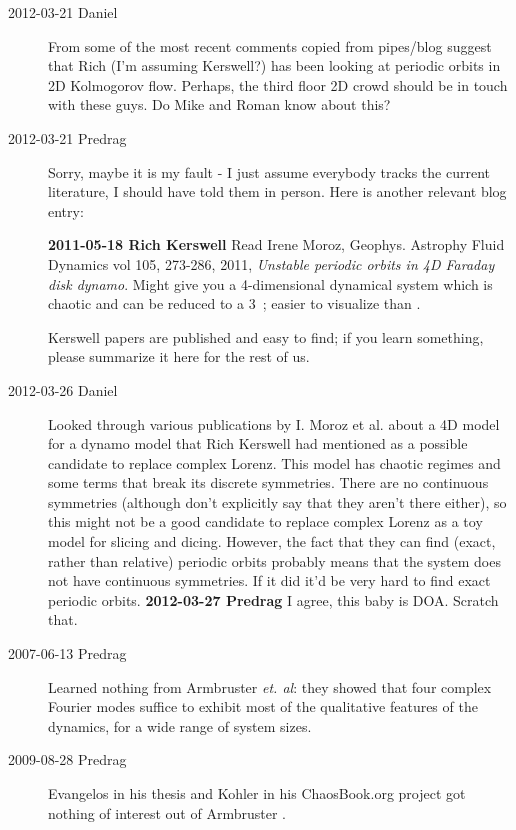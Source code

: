 \begin{description}
\item[2012-03-21 Daniel]
From some of the most recent comments copied from pipes/blog suggest that
Rich (I'm assuming Kerswell?) has been looking at periodic orbits in 2D
Kolmogorov flow. Perhaps, the third floor 2D crowd should be in touch
with these guys. Do Mike and Roman know about this?

\item[2012-03-21 Predrag]
Sorry, maybe it is my fault - I just assume everybody tracks the current
literature, I should have told them in person. Here is another relevant
blog entry:

{\bf 2011-05-18  Rich Kerswell} Read Irene Moroz, Geophys. Astrophy Fluid
Dynamics vol 105, 273-286, 2011, \emph{Unstable periodic orbits in 4D
Faraday disk dynamo}. Might give you a 4-dimensional dynamical system
which is chaotic and can be reduced to a 3\dmn\ \statesp; easier to
visualize than {\cLf}.

Kerswell papers are published and easy to find; if you learn something,
please summarize it here for the rest of us.

\item[2012-03-26 Daniel] Looked through various publications by I. Moroz
et al. about a 4D model for a dynamo model that Rich Kerswell had
mentioned as a possible candidate to replace complex Lorenz. This model
has chaotic regimes and some terms that break its discrete symmetries.
There are no continuous symmetries (although don't explicitly say that
they aren't there either), so this might not be a good candidate to
replace complex Lorenz as a toy model for slicing and dicing. However,
the fact that they can find (exact, rather than relative) periodic orbits
probably means that the system does not have continuous symmetries. If it
did it'd be very hard to find exact periodic orbits.
{\bf 2012-03-27 Predrag} I agree, this baby is DOA. Scratch that.

\item[2007-06-13 Predrag]
Learned nothing from Armbruster {\em et. al}: they showed that four
complex Fourier modes suffice to exhibit most of the qualitative features
of the dynamics, for a wide range of system sizes.

\item[2009-08-28 Predrag] Evangelos in his thesis and Kohler in his
 {ChaosBook.org project} got nothing
of interest out of Armbruster \etal{}.


\end{description}
